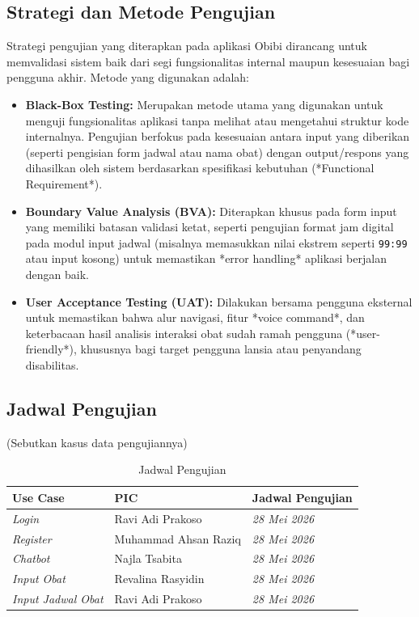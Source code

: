 \documentclass[12pt, a4paper]{article}
\begin{document}
\subsection{Strategi dan Metode Pengujian}

Strategi pengujian yang diterapkan pada aplikasi Obibi dirancang untuk memvalidasi sistem baik dari segi fungsionalitas internal maupun kesesuaian bagi pengguna akhir. Metode yang digunakan adalah:
\begin{itemize}[leftmargin=2em]
  \item \textbf{Black-Box Testing:} Merupakan metode utama yang digunakan untuk menguji fungsionalitas aplikasi tanpa melihat atau mengetahui struktur kode internalnya. Pengujian berfokus pada kesesuaian antara input yang diberikan (seperti pengisian form jadwal atau nama obat) dengan output/respons yang dihasilkan oleh sistem berdasarkan spesifikasi kebutuhan (*Functional Requirement*).
  \item \textbf{Boundary Value Analysis (BVA):} Diterapkan khusus pada form input yang memiliki batasan validasi ketat, seperti pengujian format jam digital pada modul input jadwal (misalnya memasukkan nilai ekstrem seperti \texttt{99:99} atau input kosong) untuk memastikan *error handling* aplikasi berjalan dengan baik.
  \item \textbf{User Acceptance Testing (UAT):} Dilakukan bersama pengguna eksternal untuk memastikan bahwa alur navigasi, fitur *voice command*, dan keterbacaan hasil analisis interaksi obat sudah ramah pengguna (*user-friendly*), khususnya bagi target pengguna lansia atau penyandang disabilitas.
\end{itemize}

\subsection{Jadwal Pengujian}

(Sebutkan kasus data pengujiannya)

\begin{table}[h!]
  \caption{Jadwal Pengujian}
  \centering
  \begin{tabularx}{\textwidth}{|X|X|X|}
    \hline
    \textbf{Use Case}  & \textbf{PIC}  & \textbf{Jadwal Pengujian} \\
    \hline
    \textit{Login}     & Ravi Adi Prakoso        & \textit{28 Mei 2026}    \\
    \hline
    \textit{Register}  & Muhammad Ahsan Raziq          & \textit{28 Mei 2026}    \\
    \hline
    \textit{Chatbot}   & Najla Tsabita           & \textit{28 Mei 2026}    \\
    \hline
    \textit{Input Obat}     & Revalina Rasyidin          & \textit{28 Mei 2026}    \\
    \hline
    \textit{Input Jadwal Obat}     & Ravi Adi Prakoso        & \textit{28 Mei 2026}    \\
    \hline
  \end{tabularx}
\end{table}
\end{document}
